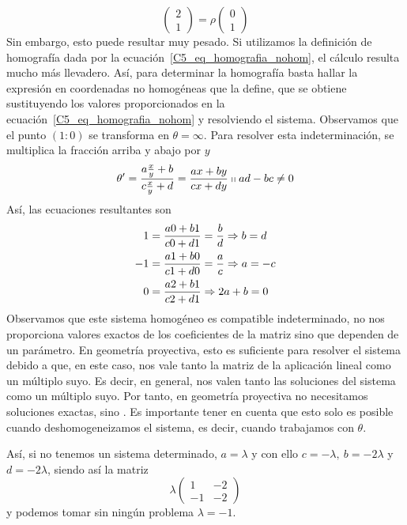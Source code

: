 \begin{exa}
\begin{equation*}
		\left( \begin{array}{c}
			2\\ 1
		\end{array}\right)=\rho
		\left( \begin{array}{c}
			0\\ 1
		\end{array}\right)
	\end{equation*}
	Sin embargo, esto puede resultar muy pesado. Si utilizamos la definición de homografía dada por la ecuación~\eqref{C5_eq_homografia_nohom}, el cálculo resulta mucho más llevadero. Así, para determinar la homografía basta hallar la expresión en coordenadas no homogéneas que la define, que se obtiene sustituyendo los valores proporcionados en la ecuación~\eqref{C5_eq_homografia_nohom} y resolviendo el sistema. Observamos que el punto $(1:0)$ se transforma en $\theta=\infty$. Para resolver esta indeterminación, se multiplica la fracción arriba y abajo por $y$
	\begin{equation}
		\theta'=\frac{a\frac{x}{y}+b}{c\frac{x}{y}+d}=\frac{ax+by}{cx +dy}\shortparallel ad-bc\not=0
	\end{equation}
	Así, las ecuaciones resultantes son
	\begin{equation*}
		\begin{split}
			1&=\frac{a0+b1}{c0 +d1}=\frac{b}{d}\Rightarrow b=d\\
			-1&=\frac{a1+b0}{c1 +d0}=\frac{a}{c}\Rightarrow a=-c\\
			0&=\frac{a2+b1}{c2 +d1}\Rightarrow 2a+b=0
		\end{split}
	\end{equation*}
	Observamos que este sistema homogéneo es compatible indeterminado, no nos proporciona valores exactos de los coeficientes de la matriz sino que dependen de un parámetro. En geometría proyectiva, esto es suficiente para resolver el sistema debido a que, en este caso, nos vale tanto la matriz de la aplicación lineal como un múltiplo suyo. Es decir, en general, nos valen tanto las soluciones del sistema como un múltiplo suyo. Por tanto, en geometría proyectiva no necesitamos soluciones exactas, sino . Es importante tener en cuenta que esto solo es posible cuando deshomogeneizamos el sistema, es decir, cuando trabajamos con $\theta$.
	
	Así, si no tenemos un sistema determinado, $a=\lambda$ y con ello $c=-\lambda, \ b=-2\lambda$ y $d=-2\lambda$, siendo así la matriz
	\begin{equation*}
	 \lambda \left( \begin{array}{cc}
	 1&-2\\ -1&-2
	 \end{array}\right) 
	\end{equation*}
	y podemos tomar sin ningún problema $\lambda=-1$.
	

\end{exa}
